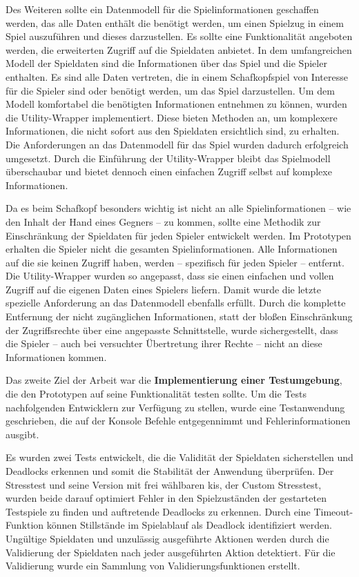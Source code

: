 \documentclass[
							a4paper, 
							11pt, 
							openany, 
							liststotoc,
							parskip=half, 
   							headings=normal
						]{scrreprt}
\begin{document}
{Des Weiteren sollte ein Datenmodell für die Spielinformationen geschaffen werden, das alle Daten enthält die benötigt werden, um einen Spielzug in einem Spiel auszuführen und dieses darzustellen. Es sollte eine Funktionalität angeboten werden, die erweiterten Zugriff auf die Spieldaten anbietet.\newline
In dem umfangreichen Modell der Spieldaten sind die Informationen über das Spiel und die Spieler enthalten. Es sind alle Daten vertreten, die in einem Schafkopfspiel von Interesse für die Spieler sind oder benötigt werden, um das Spiel darzustellen. Um dem Modell komfortabel die benötigten Informationen entnehmen zu können, wurden die Utility-Wrapper implementiert. Diese bieten Methoden an, um komplexere Informationen, die nicht sofort aus den Spieldaten ersichtlich sind, zu erhalten.\newline
Die Anforderungen an das Datenmodell für das Spiel wurden dadurch erfolgreich umgesetzt. Durch die Einführung der Utility-Wrapper bleibt das Spielmodell überschaubar und bietet dennoch einen einfachen Zugriff selbst auf komplexe Informationen.

Da es beim Schafkopf besonders wichtig ist nicht an alle Spielinformationen -- wie den Inhalt der Hand eines Gegners -- zu kommen, sollte eine Methodik zur Einschränkung der Spieldaten für jeden Spieler entwickelt werden.\newline
Im Prototypen erhalten die Spieler nicht die gesamten Spielinformationen. Alle Informationen auf die sie keinen Zugriff haben, werden -- spezifisch für jeden Spieler -- entfernt. Die Utility-Wrapper wurden so angepasst, dass sie einen einfachen und vollen Zugriff auf die eigenen Daten eines Spielers liefern. \newline
Damit wurde die letzte spezielle Anforderung an das Datenmodell ebenfalls erfüllt. Durch die komplette Entfernung der nicht zugänglichen Informationen, statt der bloßen Einschränkung der Zugriffsrechte über eine angepasste Schnittstelle, wurde sichergestellt, dass die Spieler -- auch bei versuchter Übertretung ihrer Rechte -- nicht an diese Informationen kommen.

Das zweite Ziel der Arbeit war die \textbf{Implementierung einer Testumgebung}, die den Prototypen auf seine Funktionalität testen sollte. Um die Tests nachfolgenden Entwicklern zur Verfügung zu stellen, wurde eine Testanwendung geschrieben, die auf der Konsole Befehle entgegennimmt und Fehlerinformationen ausgibt.

Es wurden zwei Tests entwickelt, die die Validität der Spieldaten sicherstellen und Deadlocks erkennen und somit die Stabilität der Anwendung überprüfen. Der Stresstest und seine Version mit frei wählbaren \acs{ki}s, der Custom Stresstest, wurden beide darauf optimiert Fehler in den Spielzuständen der gestarteten Testspiele zu finden und auftretende Deadlocks zu erkennen. Durch eine Timeout-Funktion können Stillstände im Spielablauf als Deadlock identifiziert werden. Ungültige Spieldaten und unzulässig ausgeführte Aktionen werden durch die Validierung der Spieldaten nach jeder ausgeführten Aktion detektiert. Für die Validierung wurde ein Sammlung von Validierungsfunktionen erstellt.

}
\end{document}
